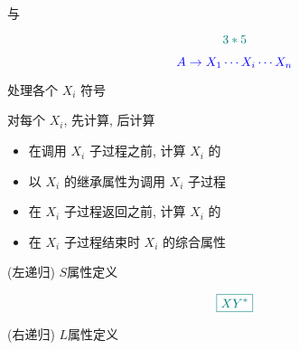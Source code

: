 \begin{frame}{}
  \begin{center}
     与 

    \vspace{0.30cm}
    \vspace{-0.20cm}
    \[
      \textcolor{teal}{3 \ast 5}
    \]

    \vspace{-0.50cm}
    \[
      \textcolor{blue}{A \to X_{1} \cdots X_{i} \cdots X_{n}}
    \]

     处理各个 $X_{i}$ 符号

    \vspace{0.10cm}
    对每个 $X_{i}$, 先计算, 后计算
  \end{center}
\end{frame}

\begin{frame}{}
  \begin{center}

    \vspace{0.80cm}
    \begin{itemize}
      \centering
      \setlength{\itemsep}{15pt}
      \item 在调用 $X_{i}$ 子过程之前, 计算 $X_{i}$ 的
      \item 以 $X_{i}$ 的继承属性为调用 $X_{i}$ 子过程
      \vspace{10pt}
      \item 在 $X_{i}$ 子过程返回之前, 计算 $X_{i}$ 的
      \item 在 $X_{i}$ 子过程结束时 $X_{i}$ 的综合属性
    \end{itemize}
  \end{center}
\end{frame}

\begin{frame}{}
  \begin{center}
    (左递归) $S$属性定义
    \vspace{-0.50cm}
    

    \vspace{-0.60cm}
    \[
      \textcolor{teal}{\boxed{X Y^{\ast}}}
    \]

    (右递归) $L$属性定义
    \vspace{-0.50cm}
    
  \end{center}
\end{frame}


